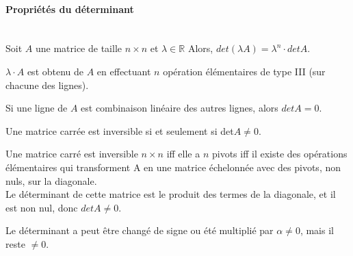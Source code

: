 \documentclass[11pt]{book}
\begin{document}
\paragraph{Propriétés du déterminant}
\\

Soit $A$ une matrice de taille $n \times n$ et $\lambda \in \mathbb{R}$ Alors, $det (\lambda A) = \lambda^n \cdot det A $.
\begin{preuve}
    $\lambda \cdot A$ est obtenu de $A$ en effectuant $n$ opération élémentaires de type III (sur chacune des lignes).
    \end{preuve}
    \begin{framedremark}
        Si une ligne de $A$ est combinaison linéaire des autres lignes, alors $det A = 0$.
    \end{framedremark}
    \begin{theorem}
        Une matrice carrée est inversible si et seulement si det$A \neq 0$.
    \end{theorem}
    \begin{preuve}
        Une matrice carré est inversible $n\times n$ iff elle a $n$ pivots iff il existe des opérations élémentaires qui transforment A en une matrice échelonnée avec des pivots, non nuls, sur la diagonale.
        \\
        Le déterminant de cette matrice est le produit des termes de la diagonale, et il est non nul, donc $det A \neq 0$.
    \end{preuve}
    \begin{framedremark}
        Le déterminant a peut être changé de signe ou été multiplié par $\alpha \neq 0$, mais il reste $\neq 0$.
    \end{framedremark}
    
\end{document}
